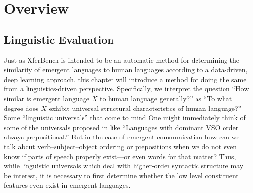 \section{Overview}


\subsection{Linguistic Evaluation}

Just as XferBench is intended to be an automatic method for determining the similarity of emergent languages to human languages according to a data-driven, deep learning approach, this chapter will introduce a method for doing the same from a linguistics-driven perspective.
Specifically, we interpret the question ``How similar is emergent language $X$ to human language generally?'' as ``To what degree does $X$ exhibit universal structural characteristics of human language?''
Some ``linguistic universals'' that come to mind 
One might immediately think of some of the universals proposed in \citet{greenberg1963universals} like ``Languages with dominant VSO order always prepositional.''
But in the case of emergent communication how can we talk about verb--subject--object ordering or prepositions when we do not even know if parts of speech properly exist---or even words for that matter?
Thus, while linguistic universals which deal with higher-order syntactic structure may be interest, it is necessary to first determine whether the low level constituent features even exist in emergent languages.



